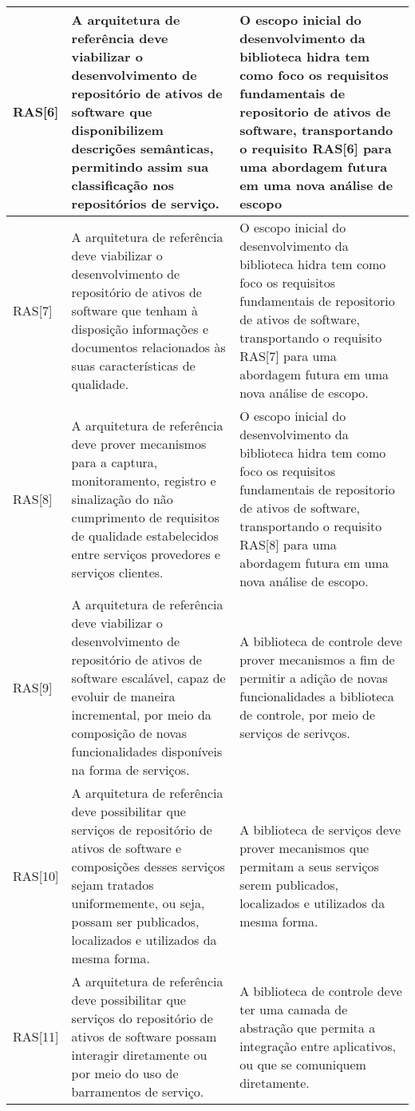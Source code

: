 \begin{longtable}{ | l | p{6cm} | p{6cm} |}
 \\ \hline
RAS[6] & 
A arquitetura de referência deve viabilizar o desenvolvimento  de repositório de ativos de software que disponibilizem  descrições semânticas, permitindo assim sua classificação nos  repositórios de serviço. & O escopo inicial do desenvolvimento da biblioteca hidra tem como foco os requisitos fundamentais de repositorio de ativos de software, transportando o requisito RAS[6] para uma abordagem futura em uma nova análise de escopo
\\ \hline
RAS[7] & 
A arquitetura de referência deve viabilizar o desenvolvimento  de repositório de ativos de software que tenham à disposição  informações e documentos relacionados às suas características  de qualidade. & O escopo inicial do desenvolvimento da biblioteca hidra tem como foco os requisitos fundamentais de repositorio de ativos de software, transportando o requisito RAS[7] para uma abordagem futura em uma nova análise de escopo.
 \\ \hline 

RAS[8] & 
A arquitetura de referência deve prover mecanismos para a  captura, monitoramento, registro e sinalização do não  cumprimento de requisitos de qualidade estabelecidos entre  serviços provedores e serviços clientes. & O escopo inicial do desenvolvimento da biblioteca hidra tem como foco os requisitos fundamentais de repositorio de ativos de software, transportando o requisito RAS[8] para uma abordagem futura em uma nova análise de escopo.
 \\ \hline 

RAS[9] & 
A arquitetura de referência deve viabilizar o desenvolvimento
de repositório de ativos de software escalável, capaz de evoluir 
de maneira incremental, por meio da composição de novas 
funcionalidades disponíveis na forma de serviços. & A biblioteca de controle deve prover mecanismos a fim de permitir a adição de novas funcionalidades a biblioteca de controle, por meio de serviços de serivços.
 \\ \hline 
 RAS[10] & 
A arquitetura de referência deve possibilitar que serviços de  repositório de ativos de software e composições desses  serviços sejam tratados uniformemente, ou seja, possam ser  publicados, localizados e utilizados da mesma forma. & A biblioteca de serviços deve prover mecanismos que permitam a seus serviços serem publicados, localizados e utilizados da mesma forma.
 \\ \hline 
 
 RAS[11] & 

A arquitetura de referência deve possibilitar que serviços do  repositório de ativos de software possam interagir diretamente  ou por meio do uso de barramentos de serviço. & 
A biblioteca de controle deve ter uma camada de abstração que permita a integração entre aplicativos, ou que se comuniquem diretamente.

 \\ \hline 

\end{longtable}